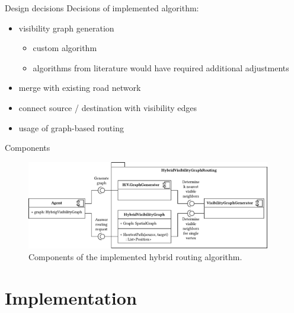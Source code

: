 \documentclass[xcolor={x11names}]{beamer}
\renewcommand{\n}{\hfill\\[0.5ex]}
\newenvironment{figcenter}
{%
	\parskip=0pt%
	\par%
	\nopagebreak%
	\centering%
}%
{%
	\par%
	\noindent%
	\ignorespacesafterend%
}
\begin{document}
		\begin{frame}{Design decisions}
			Decisions of implemented algorithm:\n
			\begin{itemize}
				\item visibility graph generation
				\begin{itemize}
					\item custom algorithm
					\item algorithms from literature would have required additional adjustments
				\end{itemize}
				\item merge with existing road network
				\item connect source / destination with visibility edges
				\item usage of graph-based routing
			\end{itemize}
		\end{frame}
		
		\begin{frame}{Components}
			\begin{figure}[t]
				\begin{figcenter}
					\includegraphics[width=0.95\textwidth]{images/components.pdf}
				\end{figcenter}
				\caption{Components of the implemented hybrid routing algorithm.}
			\end{figure}
		\end{frame}
	
	\section{Implementation}
	
\end{document}
